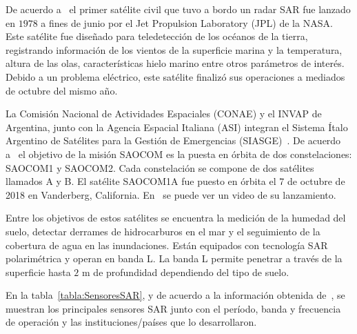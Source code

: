 De acuerdo a~\cite{Seasat} el primer satélite civil que tuvo a bordo un radar SAR fue lanzado en $1978$ a fines de junio por el Jet Propulsion Laboratory (JPL) de la NASA. Este satélite fue diseñado para teledetección de los océanos de la tierra, registrando información de los vientos de la superficie marina y la temperatura, altura de las olas, características hielo marino entre otros parámetros de interés. Debido a un problema eléctrico, este satélite finalizó sus operaciones a mediados de octubre del mismo año.


La Comisión Nacional de Actividades Espaciales (CONAE) y el INVAP de Argentina, junto con la Agencia Espacial Italiana (ASI) integran el Sistema Ítalo Argentino de Satélites para la Gestión de Emergencias (SIASGE)~\cite{Invap}. De acuerdo a~\cite{Saocom} el objetivo de la misión SAOCOM es la puesta en órbita de dos constelaciones: SAOCOM1 y SAOCOM2. Cada constelación se compone de dos satélites llamados A y B. El satélite SAOCOM1A fue puesto en órbita el 7 de octubre de 2018 en Vanderberg, California. En~\cite{Saocom} se puede ver un video de su lanzamiento.

Entre los objetivos de estos satélites se encuentra la medición de la humedad del suelo, detectar derrames de hidrocarburos en el mar y el seguimiento de la cobertura de agua en las inundaciones. Están equipados con tecnología SAR polarimétrica y operan en banda L. La banda L permite penetrar a través de la superficie hasta $2$ m de profundidad dependiendo del tipo de suelo. 

En la tabla~\ref{tabla:SensoresSAR}, y de acuerdo a la información obtenida de~\cite{Moreira2013}, se muestran los principales sensores SAR junto con el período, banda y frecuencia de operación y las instituciones/países que lo desarrollaron. 

